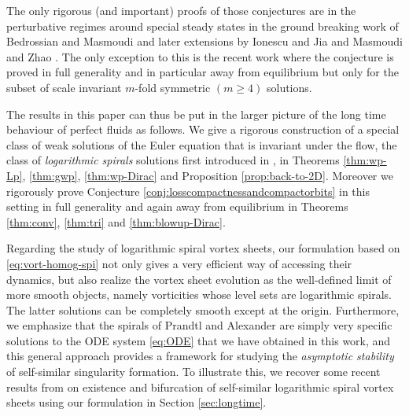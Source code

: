 \documentclass[10pt]{amsart}
\theoremstyle{plain}
\theoremstyle{definition}
\begin{document}
The only rigorous (and important) proofs of those conjectures are in the perturbative regimes around special steady states in the ground breaking work of Bedrossian and Masmoudi \cite{BedrossianMasmoudi} and later extensions by Ionescu and Jia \cite{IonescuJia1,IonescuJia2} and Masmoudi and Zhao \cite{MasmoudiZhao}. The only exception to this is the recent work \cite{EMS} where the conjecture is proved in full generality and in particular away from equilibrium but only for the subset of scale invariant $m$-fold symmetric $(m\geq4)$ solutions.

The results in this paper can thus be put in the larger picture of the long time behaviour of perfect fluids as follows. We give a rigorous construction of a special class of weak solutions of the Euler equation that is invariant under the flow, the class of \textit{logarithmic spirals} solutions first introduced in \cite{EJSVP1}, in Theorems \ref{thm:wp-Lp}, \ref{thm:gwp}, \ref{thm:wp-Dirac} and Proposition \ref{prop:back-to-2D}. Moreover we rigorously prove Conjecture \ref{conj:losscompactnessandcompactorbits} in this setting in full generality and again away from equilibrium in Theorems \ref{thm:conv}, \ref{thm:tri} and \ref{thm:blowup-Dirac}.

Regarding the study of logarithmic spiral vortex sheets, our formulation based on \eqref{eq:vort-homog-spi} not only gives a very efficient way of accessing their dynamics, but also realize the vortex sheet evolution as the well-defined limit of more smooth objects, namely vorticities whose level sets are logarithmic spirals. The latter solutions can be completely smooth except at the origin. Furthermore, we emphasize that the spirals of Prandtl and Alexander are simply very specific solutions to the ODE system \eqref{eq:ODE} that we have obtained in this work, and this general approach provides a framework for studying the \textit{asymptotic stability} of self-similar singularity formation. To illustrate this, we recover some recent results from \cite{Elling-Gnann,CKW21,CKW22} on existence and bifurcation of self-similar logarithmic spiral vortex sheets using our formulation in Section \ref{sec:longtime}.
\end{document}
